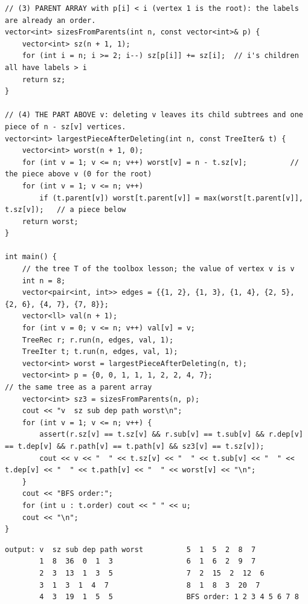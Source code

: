 \begin{lstlisting}[style=cpp]
// (3) PARENT ARRAY with p[i] < i (vertex 1 is the root): the labels are already an order.
vector<int> sizesFromParents(int n, const vector<int>& p) {
    vector<int> sz(n + 1, 1);
    for (int i = n; i >= 2; i--) sz[p[i]] += sz[i];  // i's children all have labels > i
    return sz;
}

// (4) THE PART ABOVE v: deleting v leaves its child subtrees and one piece of n - sz[v] vertices.
vector<int> largestPieceAfterDeleting(int n, const TreeIter& t) {
    vector<int> worst(n + 1, 0);
    for (int v = 1; v <= n; v++) worst[v] = n - t.sz[v];          // the piece above v (0 for the root)
    for (int v = 1; v <= n; v++)
        if (t.parent[v]) worst[t.parent[v]] = max(worst[t.parent[v]], t.sz[v]);   // a piece below
    return worst;
}

int main() {
    // the tree T of the toolbox lesson; the value of vertex v is v
    int n = 8;
    vector<pair<int, int>> edges = {{1, 2}, {1, 3}, {1, 4}, {2, 5}, {2, 6}, {4, 7}, {7, 8}};
    vector<ll> val(n + 1);
    for (int v = 0; v <= n; v++) val[v] = v;
    TreeRec r; r.run(n, edges, val, 1);
    TreeIter t; t.run(n, edges, val, 1);
    vector<int> worst = largestPieceAfterDeleting(n, t);
    vector<int> p = {0, 0, 1, 1, 1, 2, 2, 4, 7};                     // the same tree as a parent array
    vector<int> sz3 = sizesFromParents(n, p);
    cout << "v  sz sub dep path worst\n";
    for (int v = 1; v <= n; v++) {
        assert(r.sz[v] == t.sz[v] && r.sub[v] == t.sub[v] && r.dep[v] == t.dep[v] && r.path[v] == t.path[v] && sz3[v] == t.sz[v]);
        cout << v << "  " << t.sz[v] << "  " << t.sub[v] << "  " << t.dep[v] << "  " << t.path[v] << "  " << worst[v] << "\n";
    }
    cout << "BFS order:";
    for (int u : t.order) cout << " " << u;
    cout << "\n";
}
\end{lstlisting}

\begin{lstlisting}[style=trace]
output: v  sz sub dep path worst          5  1  5  2  8  7
        1  8  36  0  1  3                 6  1  6  2  9  7
        2  3  13  1  3  5                 7  2  15  2  12  6
        3  1  3  1  4  7                  8  1  8  3  20  7
        4  3  19  1  5  5                 BFS order: 1 2 3 4 5 6 7 8
\end{lstlisting}

